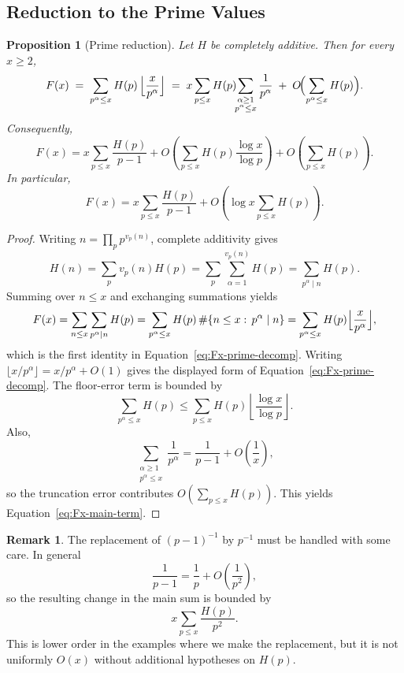 \documentclass[11pt]{article}
\newtheorem{proposition}{Proposition}
\theoremstyle{definition}
\newtheorem{remark}{Remark}
\newcommand{\p}{\boldsymbol p}
\begin{document}
\subsection{Reduction to the Prime Values}

\begin{proposition}[Prime reduction]\label{prop:prime-reduction}
Let $H$ be completely additive. Then for every $x\ge 2$,
\begin{equation}\label{eq:Fx-prime-decomp}
  F(x)
  \;=\;
  \sum_{p^\alpha\le x} H(p)\,\Bigl\lfloor \frac{x}{p^\alpha}\Bigr\rfloor
  \;=\;
  x\sum_{p\le x} H(p)\!\!\sum_{\substack{\alpha\ge1\\ p^\alpha\le x}}\frac{1}{p^\alpha}
  \;+\;
  O\!\Bigl(\sum_{p^\alpha\le x} H(p)\Bigr).
\end{equation}
Consequently,
\begin{equation}\label{eq:Fx-main-term}
  F(x)
  =
  x\sum_{p\le x}\frac{H(p)}{p-1}
  +
  O\!\left(
    \sum_{p\le x} H(p)\frac{\log x}{\log p}
  \right)
  +
  O\!\left(\sum_{p\le x}H(p)\right).
\end{equation}
In particular,
\[
  F(x)
  =
  x\sum_{p\le x}\frac{H(p)}{p-1}
  +
  O\!\left(
    \log x\sum_{p\le x}H(p)
  \right).
\]
\end{proposition}

\begin{proof}
Writing $n=\prod_p p^{v_p(n)}$, complete additivity gives
\[
H(n)=\sum_p v_p(n)H(p)=\sum_p\sum_{\alpha=1}^{v_p(n)}H(p)=\sum_{p^\alpha\mid n}H(p).
\]
Summing over $n\le x$ and exchanging summations yields
\[
F(x)=\sum_{n\le x}\sum_{p^\alpha\mid n}H(p)
=\sum_{p^\alpha\le x}H(p)\,\#\{n\le x:\,p^\alpha\mid n\}
=\sum_{p^\alpha\le x}H(p)\Bigl\lfloor \frac{x}{p^\alpha}\Bigr\rfloor,
\]
which is the first identity in Equation~\eqref{eq:Fx-prime-decomp}.  Writing
$\lfloor x/p^\alpha\rfloor=x/p^\alpha+O(1)$ gives the displayed form of
Equation~\eqref{eq:Fx-prime-decomp}.  The floor-error term is bounded by
\[
  \sum_{p^\alpha\le x}H(p)
  \le
  \sum_{p\le x}H(p)\left\lfloor\frac{\log x}{\log p}\right\rfloor.
\]
Also,
\[
  \sum_{\substack{\alpha\ge1\\p^\alpha\le x}}\frac1{p^\alpha}
  =
  \frac1{p-1}+O\!\left(\frac1x\right),
\]
so the truncation error contributes $O(\sum_{p\le x}H(p))$.  This yields
Equation~\eqref{eq:Fx-main-term}.
\end{proof}

\begin{remark}\label{rem:pminus1}
The replacement of $(p-1)^{-1}$ by $p^{-1}$ must be handled with some care.
In general
\[
  \frac1{p-1}=\frac1p+O\!\left(\frac1{p^2}\right),
\]
so the resulting change in the main sum is bounded by
\[
  x\sum_{p\le x}\frac{H(p)}{p^2}.
\]
This is lower order in the examples where we make the replacement, but it is not
uniformly $O(x)$ without additional hypotheses on $H(p)$.
\end{remark}
\end{document}
